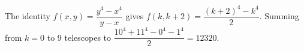 The identity $f(x,y)=\dfrac{y^4-x^4}{y-x}$ gives $f(k,k+2)=\dfrac{(k+2)^4-k^4}{2}$. Summing from $k=0$ to $9$ telescopes to $\dfrac{10^4+11^4-0^4-1^4}{2}=\boxed{12320}$.
